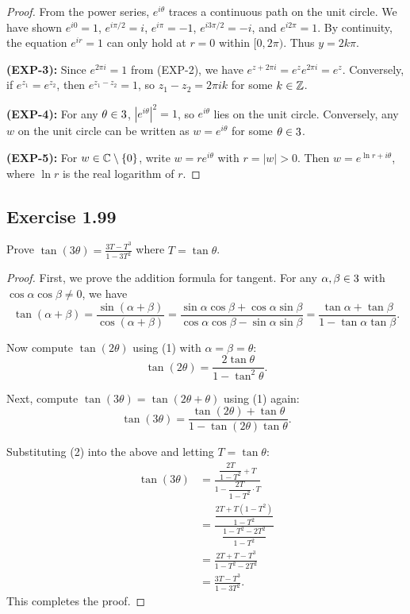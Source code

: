 \documentclass{article}
\begin{document}
\begin{proof}
  From the power series, $e^{i\theta}$ traces a continuous path on the
  unit circle. We have shown $e^{i0} = 1$, $e^{i\pi/2} = i$, $e^{i\pi} = -1$,
  $e^{i3\pi/2} = -i$, and $e^{i2\pi} = 1$. By continuity, the equation
  $e^{ir} = 1$ can only hold at $r = 0$ within $[0, 2\pi)$. Thus $y = 2k\pi$.

  \textbf{(EXP-3):} Since $e^{2\pi i} = 1$ from (EXP-2), we have
  $e^{z + 2\pi i} = e^z e^{2\pi i} = e^z$. Conversely, if $e^{z_1} = e^{z_2}$,
  then $e^{z_1 - z_2} = 1$, so $z_1 - z_2 = 2\pi i k$ for some $k \in \mathbb{Z}$.

  \textbf{(EXP-4):} For any $\theta \in 3$, $|e^{i\theta}|^2 = 1$, so
  $e^{i\theta}$ lies on the unit circle. Conversely, any $w$ on the unit
  circle can be written as $w = e^{i\theta}$ for some $\theta \in 3$.

  \textbf{(EXP-5):} For $w \in \mathbb{C} \setminus \{0\}$, write $w = re^{i\theta}$
  with $r = |w| > 0$. Then $w = e^{\ln r + i\theta}$, where $\ln r$ is
  the real logarithm of $r$.
\end{proof}

\subsection{Exercise 1.99}
Prove $\tan(3\theta) = \frac{3T - T^3}{1 - 3T^2}$ where $T = \tan \theta$.

\begin{proof}
  First, we prove the addition formula for tangent. For any
  $\alpha, \beta \in 3$ with $\cos\alpha\cos\beta \neq 0$, we have
  \[
    \tan(\alpha + \beta)
    = \frac{\sin(\alpha + \beta)}{\cos(\alpha + \beta)}
    = \frac{\sin\alpha\cos\beta + \cos\alpha\sin\beta}
    {\cos\alpha\cos\beta - \sin\alpha\sin\beta}
    = \frac{\tan\alpha + \tan\beta}{1 - \tan\alpha\tan\beta}.
    \tag{1}
  \]

  Now compute $\tan(2\theta)$ using (1) with $\alpha = \beta = \theta$:
  \[
    \tan(2\theta) = \frac{2\tan\theta}{1 - \tan^2\theta}.
    \tag{2}
  \]

  Next, compute $\tan(3\theta) = \tan(2\theta + \theta)$ using (1) again:
  \[
    \tan(3\theta)
    = \frac{\tan(2\theta) + \tan\theta}{1 - \tan(2\theta)\tan\theta}.
  \]

  Substituting (2) into the above and letting $T = \tan\theta$:
  \[
    \begin{aligned}
      \tan(3\theta)
      &= \frac{\dfrac{2T}{1 - T^2} + T}{1 - \dfrac{2T}{1 - T^2} \cdot T} \\
      &= \frac{\dfrac{2T + T(1 - T^2)}{1 - T^2}}
      {\dfrac{1 - T^2 - 2T^2}{1 - T^2}} \\
      &= \frac{2T + T - T^3}{1 - T^2 - 2T^2} \\
      &= \frac{3T - T^3}{1 - 3T^2}.
    \end{aligned}
  \]
  This completes the proof.
\end{proof}
\end{document}
